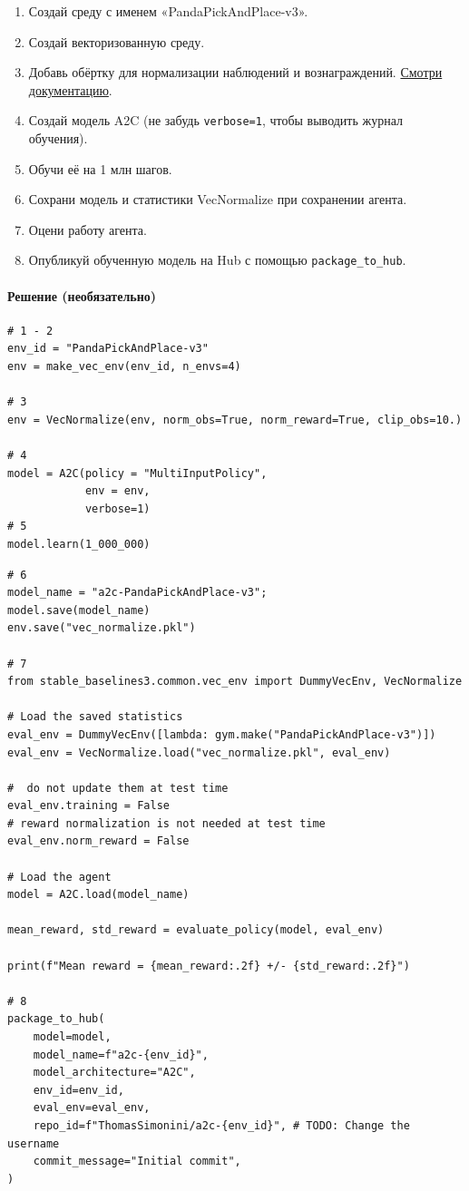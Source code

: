 \documentclass[11pt,a4paper]{article}
\begin{document}
\begin{enumerate}
\def\labelenumi{\arabic{enumi}.}
\tightlist
\item
  Создай среду с именем «PandaPickAndPlace-v3».
\item
  Создай векторизованную среду.
\item
  Добавь обёртку для нормализации наблюдений и вознаграждений. \href{https://stable-baselines3.readthedocs.io/en/master/guide/vec_envs.html\#vecnormalize}{Смотри документацию}.
\item
  Создай модель A2C (не забудь \texttt{verbose=1}, чтобы выводить журнал обучения).
\item
  Обучи её на 1 млн шагов.
\item
  Сохрани модель и статистики VecNormalize при сохранении агента.
\item
  Оцени работу агента.
\item
  Опубликуй обученную модель на Hub с помощью \texttt{package\_to\_hub}.
\end{enumerate}

\paragraph{Решение (необязательно)}\label{solution-optional}

\begin{lstlisting}
# 1 - 2
env_id = "PandaPickAndPlace-v3"
env = make_vec_env(env_id, n_envs=4)

# 3
env = VecNormalize(env, norm_obs=True, norm_reward=True, clip_obs=10.)

# 4
model = A2C(policy = "MultiInputPolicy",
            env = env,
            verbose=1)
# 5
model.learn(1_000_000)
\end{lstlisting}

\begin{lstlisting}
# 6
model_name = "a2c-PandaPickAndPlace-v3";
model.save(model_name)
env.save("vec_normalize.pkl")

# 7
from stable_baselines3.common.vec_env import DummyVecEnv, VecNormalize

# Load the saved statistics
eval_env = DummyVecEnv([lambda: gym.make("PandaPickAndPlace-v3")])
eval_env = VecNormalize.load("vec_normalize.pkl", eval_env)

#  do not update them at test time
eval_env.training = False
# reward normalization is not needed at test time
eval_env.norm_reward = False

# Load the agent
model = A2C.load(model_name)

mean_reward, std_reward = evaluate_policy(model, eval_env)

print(f"Mean reward = {mean_reward:.2f} +/- {std_reward:.2f}")

# 8
package_to_hub(
    model=model,
    model_name=f"a2c-{env_id}",
    model_architecture="A2C",
    env_id=env_id,
    eval_env=eval_env,
    repo_id=f"ThomasSimonini/a2c-{env_id}", # TODO: Change the username
    commit_message="Initial commit",
)
\end{lstlisting}
\end{document}
